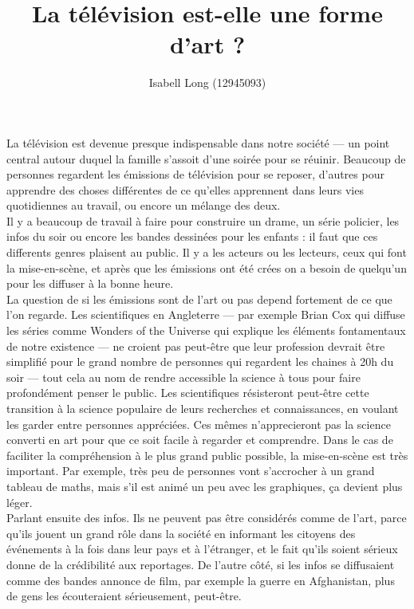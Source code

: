\documentclass[12pt,a4paper]{article}
\begin{document}
\title{La télévision est-elle une forme d'art ?}
\author{Isabell Long (12945093)}
\maketitle

La télévision est devenue presque indispensable dans notre société ---
un point central autour duquel la famille s'assoit d'une soirée pour
se réuinir. Beaucoup de personnes regardent les émissions de
télévision pour se reposer, d'autres pour apprendre des choses
différentes de ce qu'elles apprennent dans leurs vies quotidiennes au
travail, ou encore un mélange des deux.\\

Il y a beaucoup de travail à faire pour construire un drame, un série
policier, les infos du soir ou encore les bandes dessinées pour les
enfants : il faut que ces differents genres plaisent au public. Il y a
les acteurs ou les lecteurs, ceux qui font la mise-en-scène, et après
que les émissions ont été crées on a besoin de quelqu'un pour les
diffuser à la bonne heure.\\

La question de si les émissions sont de l'art ou pas depend fortement
de ce que l'on regarde. Les scientifiques en Angleterre --- par
exemple Brian Cox qui diffuse les séries comme \og{}Wonders of the
Universe\fg{} qui explique les éléments fontamentaux de notre
existence --- ne croient pas peut-être que leur profession devrait
être simplifié pour le grand nombre de personnes qui regardent les
chaines à 20h du soir --- tout cela au nom de rendre accessible la
science à tous pour faire profondément penser le public. Les
scientifiques résisteront peut-être cette transition à la science
populaire de leurs recherches et connaissances, en voulant les garder
entre personnes appréciées. Ces mêmes n'apprecieront pas la science
converti en \og{}art\fg{} pour que ce soit facile à regarder et
comprendre. Dans le cas de faciliter la compréhension à le plus grand
public possible, la mise-en-scène est très important. Par exemple,
très peu de personnes vont s'accrocher à un grand tableau de maths,
mais s'il est animé un peu avec les graphiques, ça devient plus léger.\\

Parlant ensuite des infos. Ils ne peuvent pas être considérés comme de
l'art, parce qu'ils jouent un grand rôle dans la société en informant
les citoyens des événements à la fois dans leur pays et à l'étranger,
et le fait qu'ils soient sérieux donne de la crédibilité aux
reportages. De l'autre côté, si les infos se diffusaient comme des
bandes annonce de film, par exemple la guerre en Afghanistan, plus de
gens les écouteraient sérieusement, peut-être.\\
\end{document}
